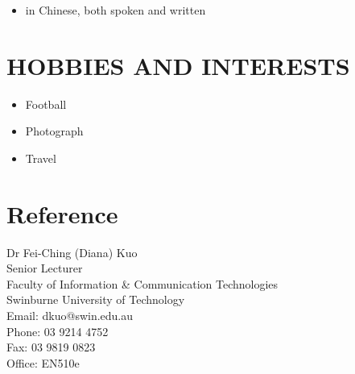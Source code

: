 \documentclass{article}
\begin{document}
	\begin{itemize}
		\item in Chinese, both spoken and written
	\end{itemize}
	
\section*{HOBBIES AND INTERESTS}

	\begin{itemize}
	\item Football
	\item Photograph
	\item Travel
	\end{itemize}
	
\section*{Reference}
	Dr Fei-Ching (Diana) Kuo \\
	Senior Lecturer \\
	Faculty of Information \& Communication Technologies \\
	Swinburne University of Technology \\
	Email: dkuo@swin.edu.au \\
	Phone: 03 9214 4752 \\
	Fax: 03 9819 0823 \\
	Office: EN510e \\
	
\end{document}
